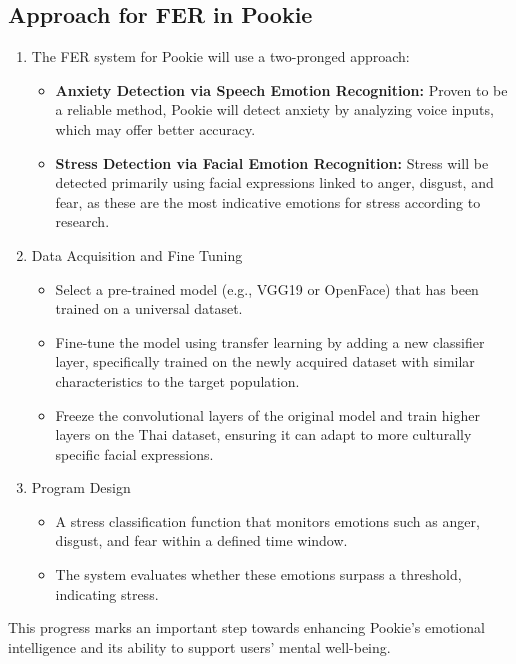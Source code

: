 \subsection{Approach for FER in Pookie}
\begin{enumerate}
    \item The FER system for Pookie will use a two-pronged approach:
    \begin{itemize}
        \item \textbf{Anxiety Detection via Speech Emotion Recognition:} Proven to be a reliable method, Pookie will detect anxiety by analyzing voice inputs, which may offer better accuracy.
        \item \textbf{Stress Detection via Facial Emotion Recognition:} Stress will be detected primarily using facial expressions linked to anger, disgust, and fear, as these are the most indicative emotions for stress according to research.
    \end{itemize}
    \item    Data Acquisition and Fine Tuning
    \begin{itemize}
        \item Select a pre-trained model (e.g., VGG19 or OpenFace) that has been trained on a universal dataset.
        \item Fine-tune the model using transfer learning by adding a new classifier layer, specifically trained on the newly acquired dataset with similar characteristics to the target population.
        \item Freeze the convolutional layers of the original model and train higher layers on the Thai dataset, ensuring it can adapt to more culturally specific facial expressions.
    \end{itemize}
    \item Program Design
    \begin{itemize}
        \item A stress classification function that monitors emotions such as anger, disgust, and fear within a defined time window.
        \item The system evaluates whether these emotions surpass a threshold, indicating stress.
    \end{itemize}

\end{enumerate}
This progress marks an important step towards enhancing Pookie's emotional intelligence and its ability to support users' mental well-being.
